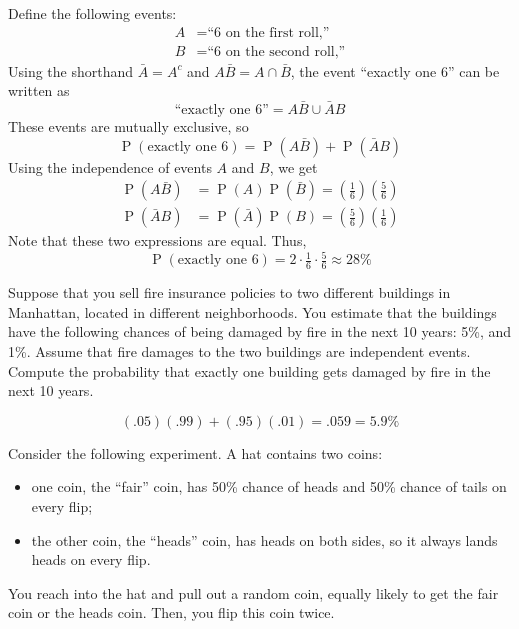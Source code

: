 \documentclass[11pt]{exam}
\DeclareMathOperator*{\Prob}{P}
\renewcommand{\Pr}{\Prob}
\begin{document}
\begin{questions}
\begin{solution}
Define the following events:
\begin{align*}
  A &= \text{``6 on the first roll,''} \\
  B &= \text{``6 on the second roll,''}
\end{align*}
Using the shorthand $\bar A = A^c$ and $A\bar B = A \cap \bar B$, the event
``exactly one 6'' can be written as
\[
  \text{``exactly one 6''}
  = A \bar B \cup \bar A B
\]
These events are mutually exclusive, so
\[
  \Pr(\text{exactly one 6})
  = \Pr(A \bar B) 
  + \Pr(\bar A B)
\]
Using the independence of events $A$ and $B$, we get
\begin{align*}
  \Pr(A \bar B)  &= \Pr(A) \Pr(\bar B) = (\tfrac{1}{6}) (\tfrac{5}{6}) \\
  \Pr(\bar A B)  &= \Pr(\bar A) \Pr(B) = (\tfrac{5}{6}) (\tfrac{1}{6})
\end{align*}
Note that these two expressions are equal.  Thus,
\[
  \Pr(\text{exactly one 6})
  = 2 \cdot \tfrac{1}{6} \cdot \tfrac{5}{6}
  \approx 28\%
\]


\end{solution}

%
%

\question Suppose that you sell fire insurance policies to two different
buildings in Manhattan, located in different neighborhoods.  You estimate that
the buildings have the following chances of being damaged by fire in the next
10 years: 5\%, and 1\%.  Assume that fire damages to the two buildings
are independent events.  Compute the probability that exactly one building
gets damaged by fire in the next 10 years.

\begin{solution}
  \[
    (.05) (.99) + (.95) (.01) = .059 = 5.9\%
  \]
\end{solution}

\newpage

\question Consider the following experiment. A hat contains two coins:
\begin{itemize}
  \item one coin, the ``fair'' coin, has 50\% chance of heads and 50\% chance of tails on
every flip;
  \item the other coin, the ``heads'' coin, has heads on both sides, so it
always lands heads on every flip.
\end{itemize}
You reach into the hat and pull out a
random coin, equally likely to get the fair coin or the heads coin. Then, you
flip this coin twice.


\end{questions}
\end{document}
